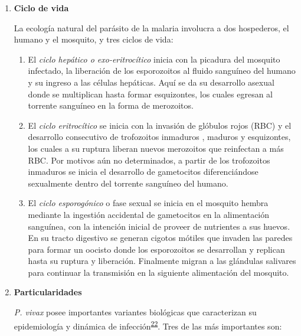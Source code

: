 \documentclass[a4paper]{article}
\providecommand{\tightlist}{%
  \setlength{\itemsep}{0pt}\setlength{\parskip}{0pt}}
\begin{document}
\begin{enumerate}
  \begin{enumerate}
  \def\labelenumii{\roman{enumii}.}
  \item
    \textbf{Ciclo de vida}

    La ecología natural del parásito de la malaria involucra a dos
    hospederos, el humano y el mosquito, y tres ciclos de vida:

    \begin{enumerate}
    \def\labelenumiii{\arabic{enumiii}.}
    \tightlist
    \item
      El \emph{ciclo hepático o exo-eritrocítico} inicia con la picadura
      del mosquito infectado, la liberación de los esporozoitos al
      fluido sanguíneo del humano y su ingreso a las células hepáticas.
      Aquí se da su desarrollo asexual donde se multiplican hasta formar
      esquizontes, los cuales egresan al torrente sanguíneo en la forma
      de merozoitos.
    \item
      El \emph{ciclo eritrocítico} se inicia con la invasión de glóbulos
      rojos (RBC) y el desarrollo consecutivo de trofozoitos inmaduros ,
      maduros y esquizontes, los cuales a su ruptura liberan nuevos
      merozoitos que reinfectan a más RBC. Por motivos aún no
      determinados, a partir de los trofozoitos inmaduros se inicia el
      desarrollo de gametocitos diferenciándose sexualmente dentro del
      torrente sanguíneo del humano.
    \item
      El \emph{ciclo esporogónico} o fase sexual se inicia en el
      mosquito hembra mediante la ingestión accidental de gametocitos en
      la alimentación sanguínea, con la intención inicial de proveer de
      nutrientes a sus huevos. En su tracto digestivo se generan cigotos
      mótiles que invaden las paredes para formar un oocisto donde los
      esporozoitos se desarrollan y replican hasta su ruptura y
      liberación. Finalmente migran a las glándulas salivares para
      continuar la transmisión en la siguiente alimentación del
      mosquito.
    \end{enumerate}
  \item
    \textbf{Particularidades}

    \emph{P. vivax} posee importantes variantes biológicas que
    caracterizan su epidemiología y dinámica de
    infección\textsuperscript{\protect\hyperlink{ref-howes2016global}{22}}.
    Tres de las más importantes son:


\end{enumerate}
\end{enumerate}
\end{document}
